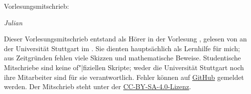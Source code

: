 

\ihead{\vorlesung{}}
\ifoot{\vspace{-1.5mm}\headmark}

\thispagestyle{empty}
\vspace*{1em}

{%
  \huge%
  Vorlesungsmitschrieb:
  \ifdef{\vorlesungInLectureHeading}{%
    \vorlesungInLectureHeading{}%
  }{%
    \vorlesung{}%
  }%
  \par%
}
\vspace*{1em}

\emph{Julian }

\vspace*{1em}

Dieser Vorlesungsmitschrieb entstand als Hörer in der Vorlesung \vorlesung{},
gelesen von \dozent{} an der Universität Stuttgart im \semester{}.
Sie dienten hauptsächlich als Lernhilfe für mich;
aus Zeitgründen fehlen viele Skizzen und mathematische Beweise.
Studentische Mitschriebe sind keine of"|fiziellen Skripte;
weder die Universität Stuttgart noch ihre Mitarbeiter sind für sie verantwortlich.
Fehler können auf \href{https://github.com/valentjn/class-notes}{GitHub} gemeldet werden.
Der Mitschrieb steht unter der
\href{https://creativecommons.org/licenses/by-sa/4.0/}{CC-BY-SA-4.0-Lizenz}.

{%
  \renewcommand*{\chaptermarkformat}{}

  \tableofcontents%
}

\pagebreak


